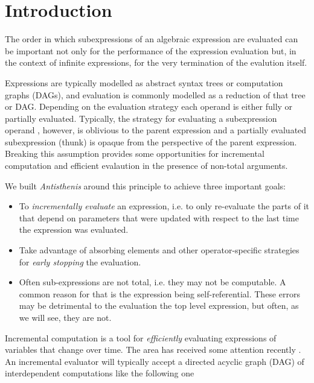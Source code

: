 \section{Introduction}
\label{sec:antisthenis_intro}

The order in which subexpressions of an algebraic expression are
evaluated can be important not only for the performance of the
expression evaluation but, in the context of infinite expressions, for
the very termination of the evalution itself.

Expressions are typically modelled as abstract syntax trees or
computation graphs (DAGs), and evaluation is commonly modelled as a
reduction of that tree or DAG. Depending on the evaluation strategy
each operand is either fully or partially evaluated. Typically, the
strategy for evaluating a subexpression operand , however, is
oblivious to the parent expression and a partially evaluated
subexpression (thunk) is opaque from the perspective of the parent
expression. Breaking this assumption provides some opportunities for
incremental computation and efficient evalaution in the presence of
non-total arguments.

We built \emph{Antisthenis} around this principle to achieve three
important goals:

\begin{itemize}
\item To \emph{incrementally evaluate} an expression, i.e. to only
  re-evaluate the parts of it that depend on parameters that were
  updated with respect to the last time the expression was evaluated.
\item Take advantage of absorbing elements and other operator-specific
  strategies for \emph{early stopping} the evaluation.
\item Often sub-expressions are not total, i.e. they may not be
  computable. A common reason for that is the expression being
  self-referential. These errors may be detrimental to the evaluation
  the top level expression, but often, as we will see, they are not.
\end{itemize}

Incremental computation is a tool for \emph{efficiently} evaluating
expressions of variables that change over time. The area has received
some attention recently
\cite{bhatotiaIncoopMapReduceIncremental2011,hammerAdaptonComposableDemanddriven2014a}. An
incremental evaluator will typically accept a directed acyclic graph
(DAG) of interdependent computations like the following one

